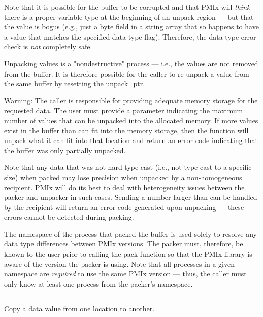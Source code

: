 Note that it is possible for the buffer to be corrupted and that \ac{PMIx} will \textit{think} there is a proper variable type at the beginning of an unpack region --- but that the value is bogus (e.g., just a byte field in a string array that so happens to have a value that matches the specified data type flag). Therefore, the data type error check is \textit{not} completely safe.

Unpacking values is a "nondestructive" process --- i.e., the values are not removed from the buffer. It is therefore possible for the caller to re-unpack a value from the same buffer by resetting the unpack_ptr.

Warning: The caller is responsible for providing adequate memory storage for the requested data. The user must provide a parameter indicating the maximum number of values that can be unpacked into the allocated memory. If more values exist in the buffer than can fit into the memory storage, then the function will unpack what it can fit into that location and return an error code indicating that the buffer was only partially unpacked.

Note that any data that was not hard type cast (i.e., not type cast to a specific size) when packed may lose precision when unpacked by a non-homogeneous recipient. \ac{PMIx} will do its best to deal with heterogeneity issues between the packer and unpacker in such cases. Sending a number larger than can be handled by the recipient will return an error code generated upon unpacking --- these errors cannot be detected during packing.

The namespace of the process that packed the buffer is used solely to resolve any data type
differences between \ac{PMIx} versions. The packer must, therefore, be
known to the user prior to calling the pack function so that the
\ac{PMIx} library is aware of the version the packer is using. Note that
all processes in a given namespace are \textit{required} to use the same \ac{PMIx}
version --- thus, the caller must only know at least one process from the
packer's namespace.


\subsection{}

\summary

Copy a data value from one location to another.

